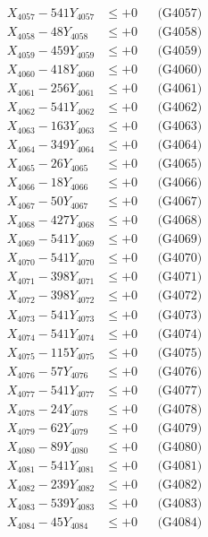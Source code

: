 \documentclass[a4paper,10pt]{article}
\begin{document}
{\begin{align}
X_{4057} - 541Y_{4057} &\leq +0 && \text{(G4057)} \\
X_{4058} - 48Y_{4058} &\leq +0 && \text{(G4058)} \\
X_{4059} - 459Y_{4059} &\leq +0 && \text{(G4059)} \\
X_{4060} - 418Y_{4060} &\leq +0 && \text{(G4060)} \\
\allowbreak
X_{4061} - 256Y_{4061} &\leq +0 && \text{(G4061)} \\
X_{4062} - 541Y_{4062} &\leq +0 && \text{(G4062)} \\
X_{4063} - 163Y_{4063} &\leq +0 && \text{(G4063)} \\
X_{4064} - 349Y_{4064} &\leq +0 && \text{(G4064)} \\
X_{4065} - 26Y_{4065} &\leq +0 && \text{(G4065)} \\
X_{4066} - 18Y_{4066} &\leq +0 && \text{(G4066)} \\
X_{4067} - 50Y_{4067} &\leq +0 && \text{(G4067)} \\
X_{4068} - 427Y_{4068} &\leq +0 && \text{(G4068)} \\
X_{4069} - 541Y_{4069} &\leq +0 && \text{(G4069)} \\
X_{4070} - 541Y_{4070} &\leq +0 && \text{(G4070)} \\
\allowbreak
X_{4071} - 398Y_{4071} &\leq +0 && \text{(G4071)} \\
X_{4072} - 398Y_{4072} &\leq +0 && \text{(G4072)} \\
X_{4073} - 541Y_{4073} &\leq +0 && \text{(G4073)} \\
X_{4074} - 541Y_{4074} &\leq +0 && \text{(G4074)} \\
X_{4075} - 115Y_{4075} &\leq +0 && \text{(G4075)} \\
X_{4076} - 57Y_{4076} &\leq +0 && \text{(G4076)} \\
X_{4077} - 541Y_{4077} &\leq +0 && \text{(G4077)} \\
X_{4078} - 24Y_{4078} &\leq +0 && \text{(G4078)} \\
X_{4079} - 62Y_{4079} &\leq +0 && \text{(G4079)} \\
X_{4080} - 89Y_{4080} &\leq +0 && \text{(G4080)} \\
\allowbreak
X_{4081} - 541Y_{4081} &\leq +0 && \text{(G4081)} \\
X_{4082} - 239Y_{4082} &\leq +0 && \text{(G4082)} \\
X_{4083} - 539Y_{4083} &\leq +0 && \text{(G4083)} \\
X_{4084} - 45Y_{4084} &\leq +0 && \text{(G4084)} \\

\end{align}}
\end{document}
